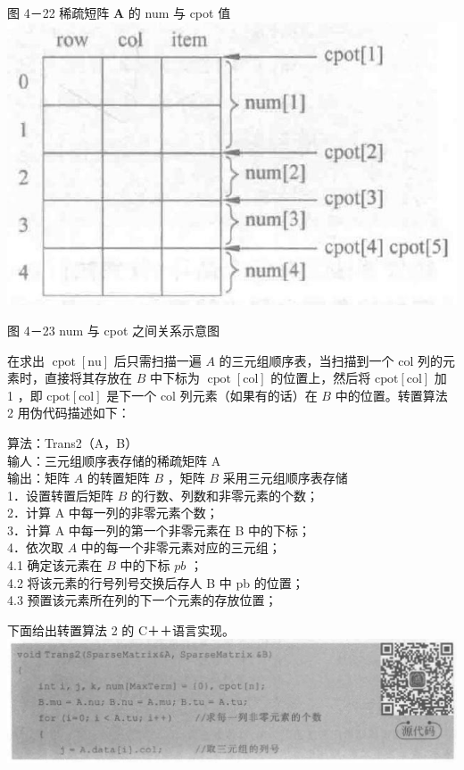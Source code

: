 \documentclass[10pt]{article}
\begin{document}
图 4－22 稀疏短阵 $\boldsymbol{A}$ 的 num 与 cpot 值\\
\includegraphics[max width=\textwidth, center]{2025_06_06_704745ea57b15b2333e5g-128}

图 4－23 num 与 cpot 之间关系示意图

在求出 $\operatorname{cpot}[\mathrm{nu}]$ 后只需扫描一遍 $A$ 的三元组顺序表，当扫描到一个 col 列的元素时，直接将其存放在 $B$ 中下标为 $\operatorname{cpot}[\mathrm{col}]$ 的位置上，然后将 $\mathrm{cpot}[\mathrm{col}]$ 加 1 ，即 $\mathrm{cpot}[\mathrm{col}]$ 是下一个 col 列元素（如果有的话）在 $B$ 中的位置。转置算法 2 用伪代码描述如下：

算法：Trans2（A，B）\\
输人：三元组顺序表存储的稀疏矩阵 A\\
输出：矩阵 $A$ 的转置矩阵 $B$ ，矩阵 $B$ 采用三元组顺序表存储\\
1．设置转置后矩阵 $B$ 的行数、列数和非零元素的个数；\\
2．计算 A 中每一列的非零元素个数；\\
3．计算 A 中每一列的第一个非零元素在 B 中的下标；\\
4．依次取 $A$ 中的每一个非零元素对应的三元组；\\
4.1 确定该元素在 $B$ 中的下标 $p b$ ；\\
4.2 将该元素的行号列号交换后存人 B 中 pb 的位置；\\
4.3 预置该元素所在列的下一个元素的存放位置；

下面给出转置算法 2 的 C＋＋语言实现。\\
\includegraphics[max width=\textwidth, center]{2025_06_06_704745ea57b15b2333e5g-128(1)}
\end{document}
